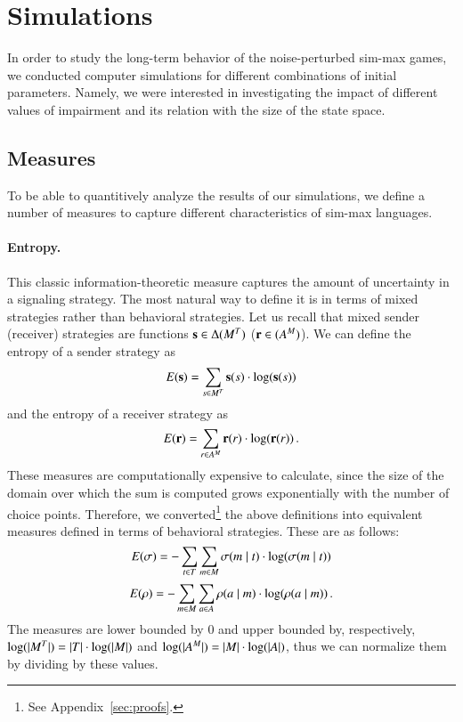 \section{Simulations}

In order to study the long-term behavior of the noise-perturbed sim-max games, we conducted computer simulations for different combinations of initial parameters.
Namely, we were interested in investigating the impact of different values of impairment and its relation with the size of the state space.

\subsection{Measures}
To be able to quantitively analyze the results of our simulations, we define a number of measures to capture different characteristics of sim-max languages.

\paragraph{Entropy.}
This classic information-theoretic measure captures the amount of uncertainty in a signaling strategy.
The most natural way to define it is in terms of mixed strategies rather than behavioral strategies.
Let us recall that mixed sender (receiver) strategies are functions $\mathrm{\mathbf{s}} \in \Delta(M^T)$ ($\mathrm{\mathbf{r}} \in (A^M)$).
We can define the entropy of a sender strategy as
\begin{align*}
  E(\mathrm{\mathbf{s}}) = \sum_{s \in M^T} \mathrm{\mathbf{s}}(s) \cdot \log(\mathrm{\mathbf{s}}(s))
\end{align*} 
and the entropy of a receiver strategy as
\begin{align*}
  E(\mathrm{\mathbf{r}}) = \sum_{r \in A^M} \mathrm{\mathbf{r}}(r) \cdot \log(\mathrm{\mathbf{r}}(r)) \,.
\end{align*} 
These measures are computationally expensive to calculate, since the size of the domain over which the sum is computed grows exponentially with the number of choice points.
Therefore, we converted\footnote{See Appendix~\ref{sec:proofs}.} the above definitions into equivalent measures defined in terms of behavioral strategies.
These are as follows:
\begin{align*}
  E(\sigma) = -\sum_{t \in T} \sum_{m \in M} \sigma(m \mid t) \cdot \log(\sigma(m \mid t))
\end{align*} 
\begin{align*}
  E(\rho) = -\sum_{m \in M} \sum_{a \in A} \rho(a \mid m) \cdot \log(\rho(a \mid m)) \,.
\end{align*}
The measures are lower bounded by $0$ and upper bounded by, respectively, $\log(|M^T|) = |T| \cdot \log(|M|)$ and $\log(|A^M|) = |M| \cdot \log(|A|)$, thus we can normalize them by dividing by these values.

